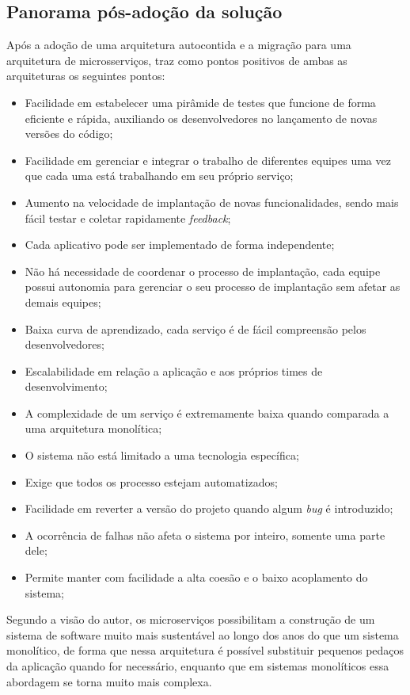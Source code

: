\subsection{Panorama pós-adoção da solução}

Após a adoção de uma arquitetura autocontida e a migração para uma arquitetura de microsserviços,
 traz como pontos positivos de ambas as arquiteturas os
seguintes pontos:

\begin{itemize}
    \item Facilidade em estabelecer uma pirâmide de testes que funcione de forma eficiente e rápida,
        auxiliando os desenvolvedores no lançamento de novas versões do código;
    \item Facilidade em gerenciar e integrar o trabalho de diferentes equipes uma vez que cada uma
        está trabalhando em seu próprio serviço;
    \item Aumento na velocidade de implantação de novas funcionalidades, sendo mais fácil testar e
        coletar rapidamente \textit{feedback};
    \item Cada aplicativo pode ser implementado de forma independente;
    \item Não há necessidade de coordenar o processo de implantação, cada equipe possui autonomia
        para gerenciar o seu processo de implantação sem afetar as demais equipes;
    \item Baixa curva de aprendizado, cada serviço é de fácil compreensão pelos desenvolvedores;
    \item Escalabilidade em relação a aplicação e aos próprios times de desenvolvimento;
    \item A complexidade de um serviço é extremamente baixa quando comparada a uma arquitetura
        monolítica;
    \item O sistema não está limitado a uma tecnologia específica;
    \item Exige que todos os processo estejam automatizados;
    \item Facilidade em reverter a versão do projeto quando algum \textit{bug} é introduzido;
    \item A ocorrência de falhas não afeta o sistema por inteiro, somente uma parte dele;
    \item Permite manter com facilidade a alta coesão e o baixo acoplamento do sistema;
\end{itemize}

Segundo a visão do autor, os microserviços possibilitam a construção de um sistema de software muito
mais sustentável ao longo dos anos do que um sistema monolítico, de forma que nessa arquitetura é
possível substituir pequenos pedaços da aplicação quando for necessário, enquanto que em sistemas
monolíticos essa abordagem se torna muito mais complexa.

